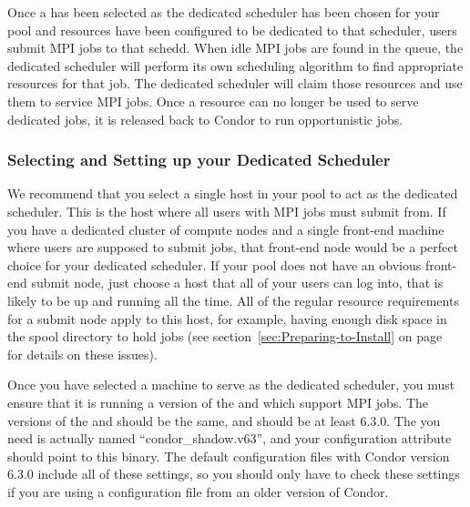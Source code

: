 Once a  has been selected as the dedicated scheduler
has been chosen for your pool and resources have been configured to be
dedicated to that scheduler, users submit MPI jobs to that schedd.
When idle MPI jobs are found in the queue, the dedicated scheduler
will perform its own scheduling algorithm to find appropriate
resources for that job.
The dedicated scheduler will claim those resources and use them to
service MPI jobs.
Once a resource can no longer be used to serve dedicated jobs, it is
released back to Condor to run opportunistic jobs.


\subsubsection{\label{sec:Setup-Dedicated-Scheduler}
Selecting and Setting up your Dedicated Scheduler}

We recommend that you select a single host in your pool to act as the
dedicated scheduler.
This is the host where all users with MPI jobs must submit from.
If you have a dedicated cluster of compute nodes and a single
front-end machine where users are supposed to submit jobs, that
front-end node would be a perfect choice for your dedicated
scheduler.
If your pool does not have an obvious front-end submit node, just
choose a host that all of your users can log into, that is likely to
be up and running all the time.
All of the regular resource requirements for a submit node apply to
this host, for example, having enough disk space in the spool
directory to hold jobs (see section~\ref{sec:Preparing-to-Install} on
page~\pageref{sec:Preparing-to-Install} for details on these issues). 

Once you have selected a machine to serve as the dedicated scheduler,
you must ensure that it is running a version of the 
and  which support MPI jobs.
The versions of the  and  should be the
same, and should be at least 6.3.0.
The  you need is actually named ``condor\_shadow.v63'',
and your  configuration attribute should point to
this binary.
The default configuration files with Condor version 6.3.0 include all
of these settings, so you should only have to check these settings if
you are using a configuration file from an older version of Condor. 


